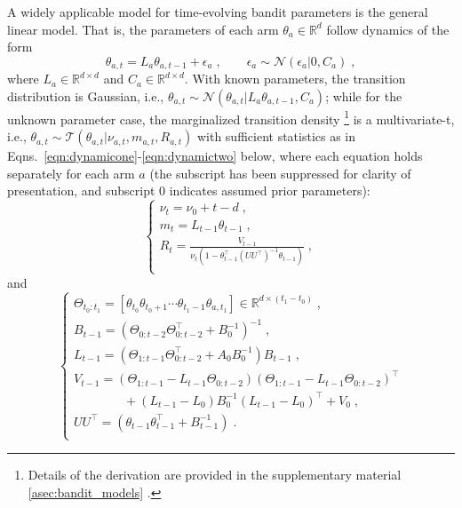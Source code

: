 \documentclass{article}
\def \Real{{\mathbb R}}
\newcommand{\ie}{i.e., }
\newcommand{\N}[1]{\mathcal{N}\left( #1\right)}
\newcommand{\T}[1]{\mathcal{T}\left( #1\right)}
\def\addappendix{}
\begin{document}
A widely applicable model for time-evolving bandit parameters is the general linear model. That is, the parameters of each arm $\theta_{a} \in \Real^{d}$ follow dynamics of the form
\begin{equation}
\theta_{a,t}=L_a \theta_{a,t-1}+\epsilon_a \;, \qquad \epsilon_a\sim\N{\epsilon_a|0, C_a} \; ,
\label{eq:linear_mixing_dynamics}
\end{equation}
where $L_a \in \Real^{d \times d}$ and $C_a \in \Real^{d \times d}$. With known parameters, the transition distribution is Gaussian, \ie $\theta_{a,t}\sim \N{\theta_{a,t}|L_a \theta_{a,t-1}, C_a} $; while for the unknown parameter case, the marginalized transition density
\footnote{Details of the derivation are provided in
	\ifx\addappendix\undefined the supplementary material \else \autoref{asec:bandit_models} \fi.}
is a multivariate-t, \ie $\theta_{a,t} \sim \T{\theta_{a,t}|\nu_{a,t}, m_{a,t}, R_{a,t}}$ with sufficient statistics as in Eqns.~\ref{eqn:dynamicone}-\ref{eqn:dynamictwo} below, where each equation holds separately for each arm $a$ (the subscript has been suppressed for clarity of presentation, and subscript $0$ indicates assumed prior parameters):
\begin{equation}
\begin{cases}
\nu_{t}=\nu_{0}+t-d \; ,\\
m_{t}=L_{t-1} \theta_{t-1} \; , \\
R_{t} = \frac{V_{t-1}}{\nu_{t}\left(1-\theta_{t-1}^\top(U U^\top)^{-1}\theta_{t-1}\right)} \; ,\\
\end{cases}
\label{eqn:dynamicone}
\end{equation}
and
\begin{equation}
\begin{cases}
\Theta_{t_0:t_1}=[\theta_{t_0} \theta_{t_0+1} \cdots \theta_{t_1-1} \theta_{a,t_1}] \in \Real^{d\times (t_1-t_0)} \; , \\
B_{t-1} = \left(\Theta_{0:t-2}\Theta_{0:t-2}^\top + B_0^{-1} \right)^{-1} \; ,\\
L_{t-1} = \left(\Theta_{1:t-1}\Theta_{0:t-2}^\top+A_0B_0^{-1}\right) B_{t-1} \; ,\\
V_{t-1}= \left(\Theta_{1:t-1}-L_{t-1} \Theta_{0:t-2}\right)\left(\Theta_{1:t-1}-L_{t-1} \Theta_{0:t-2}\right)^\top \\
\qquad \qquad + \left(L_{t-1}-L_0\right) B_0^{-1} \left(L_{t-1}-L_0\right)^\top + V_0 \; ,\\
U U^\top = \left(\theta_{t-1}\theta_{t-1}^\top+B_{t-1}^{-1}\right) \; .\\
\end{cases}
\label{eqn:dynamictwo}
\end{equation}
\end{document}
